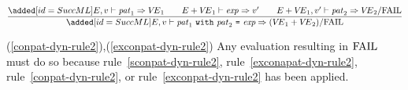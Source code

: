 \begin{equation}	%
\frac{\ADD{\E,\V\ts\pat_1\ra\VE_1 \qquad \plusmap{\E}{\VE_1}\ts\exp\ra\V'
      \qquad \plusmap{\E}{\VE_1},\V'\ts\pat_2\ra\VE_2/\fail}}
     {\ADD{\E,\V\ts\nestedpat\ra(\plusmap{\VE_1}{\VE_2})/\fail}}
\end{equation}

\EndNewEqns

%
%
\comments
\begin{description}
\item{(\ref{conpat-dyn-rule2}),(\ref{exconpat-dyn-rule2})}
  Any evaluation resulting in ${\rm FAIL}$ must do so because
rule~\ref{sconpat-dyn-rule2},
rule~\ref{exconapat-dyn-rule2},
rule~\ref{conpat-dyn-rule2},
or rule~\ref{exconpat-dyn-rule2} has been
applied.
\end{description}
